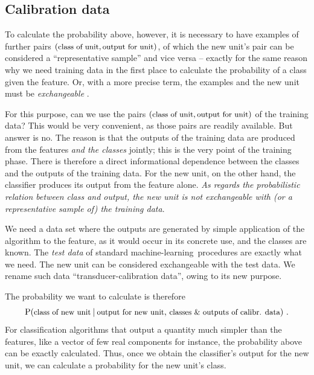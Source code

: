 \documentclass[\ifafour a4paper,12pt,\else a5paper,10pt,\fi%
onecolumn,oneside,article,%
british%
]{memoir}
\theoremstyle{remark}
\theoremstyle{innote}
\newcommand*{\amp}{\&}
\renewcommand*{\P}{\mathrm{P}}%
\renewcommand*{\|}[1][]{\nonscript\:#1\vert\nonscript\:\mathopen{}}
\newcommand*{\texts}[1]{\text{\small #1}}
\newcommand*{\ml}{machine-learning}
\begin{document}
\subsection{Calibration data}
\label{sec:calibration_data}

To calculate the probability above, however, it is necessary to have examples of further pairs $(\texts{class of unit}, \texts{output for unit})$, of which the new unit's pair can be considered a \enquote{representative sample} \autocites[for a critical analysis of the sometimes hollow term \enquote{representative sample} see][]{kruskaletal1979,kruskaletal1979b,kruskaletal1979c,kruskaletal1980} and vice versa -- exactly for the same reason why we need training data in the first place to calculate the probability of a class given the feature. Or, with a more precise term, the examples and the new unit must be \emph{exchangeable} \autocites{lindleyetal1981}.

For this purpose, can we use the pairs $(\texts{class of unit}, \texts{output for unit})$ of the training data? This would be very convenient, as those pairs are readily available. But answer is no. The reason is that the outputs of the training data are produced from the features \emph{and the classes} jointly; this is the very point of the training phase. There is therefore a direct informational dependence between the classes and the outputs of the training data. For the new unit, on the other hand, the classifier produces its output from the feature alone. \emph{As regards the probabilistic relation between class and output, the new unit is not exchangeable with (or a representative sample of) the training data}.

We need a data set where the outputs are generated by simple application of the algorithm to the feature, as it would occur in its concrete use, and the classes are known. The \emph{test data} of standard \ml\ procedures are exactly what we need. The new unit can be considered exchangeable with the test data. We rename such data \enquote{transducer-calibration data}, owing to its new purpose.

The probability we want to calculate is therefore
\begin{equation}
  \label{eq:prob_output}
  \P(\texts{class of new unit} \| \texts{output for new unit},\,
  \texts{classes \amp\ outputs of calibr. data}) \ .
\end{equation}
For classification algorithms that output a quantity much simpler than the features, like a vector of few real components for instance, the probability above can be exactly calculated. Thus, once we obtain the classifier's output for the new unit, we can calculate a probability for the new unit's class.
\end{document}
